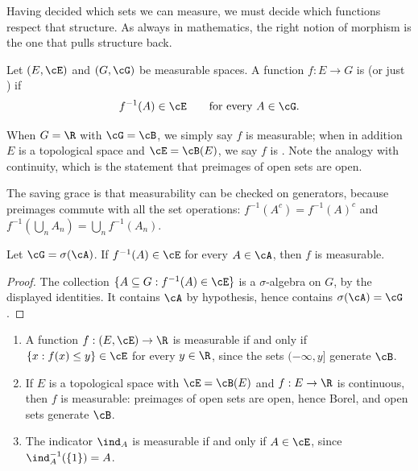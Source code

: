Having decided which sets we can measure, we must decide which functions respect that structure. As always in mathematics, the right notion of morphism is the one that pulls structure back.

\begin{definition}
	Let $(E, \cE)$ and $(G, \cG)$ be measurable spaces. A function $f : E \to G$ is  (or just ) if
	$$
	f^{-1}(A) \in \cE \qquad \text{for every } A \in \cG.
	$$
\end{definition}

When $G = \R$ with $\cG = \cB$, we simply say $f$ is measurable; when in addition $E$ is a topological space and $\cE = \cB(E)$, we say $f$ is . Note the analogy with continuity, which is the statement that preimages of open sets are open.

The saving grace is that measurability can be checked on generators, because preimages commute with all the set operations: $f^{-1}(A^c) = f^{-1}(A)^c$ and $f^{-1}(\bigcup_n A_n) = \bigcup_n f^{-1}(A_n)$.

\begin{lemma}\label{lem:meas-gen}
	Let $\cG = \sigma(\cA)$. If $f^{-1}(A) \in \cE$ for every $A \in \cA$, then $f$ is measurable.
\end{lemma}
\begin{proof}
	The collection $\{A \subseteq G : f^{-1}(A) \in \cE\}$ is a $\sigma$-algebra on $G$, by the displayed identities. It contains $\cA$ by hypothesis, hence contains $\sigma(\cA) = \cG$.
\end{proof}

\begin{example}
	\begin{enumerate}[label=(\roman*)]
		\item A function $f : (E,\cE) \to \R$ is measurable if and only if $\{x : f(x) \leq y\} \in \cE$ for every $y \in \R$, since the sets $(-\infty,y]$ generate $\cB$.
		\item If $E$ is a topological space with $\cE = \cB(E)$ and $f : E \to \R$ is continuous, then $f$ is measurable: preimages of open sets are open, hence Borel, and open sets generate $\cB$.
		\item The indicator $\ind_A$ is measurable if and only if $A \in \cE$, since $\ind_A^{-1}(\{1\}) = A$.
	\end{enumerate}
\end{example}

